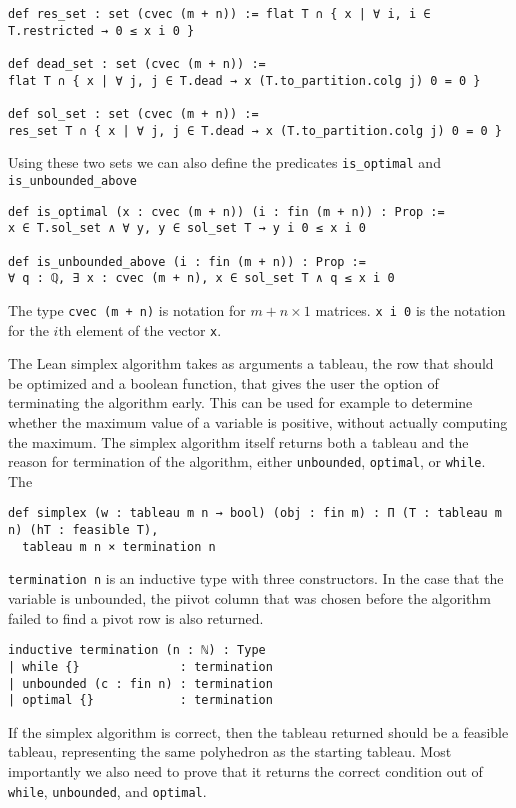 \documentclass[11pt]{article} %
\begin{document}
\begin{lstlisting}
def res_set : set (cvec (m + n)) := flat T ∩ { x | ∀ i, i ∈ T.restricted → 0 ≤ x i 0 }

def dead_set : set (cvec (m + n)) :=
flat T ∩ { x | ∀ j, j ∈ T.dead → x (T.to_partition.colg j) 0 = 0 }

def sol_set : set (cvec (m + n)) :=
res_set T ∩ { x | ∀ j, j ∈ T.dead → x (T.to_partition.colg j) 0 = 0 }
\end{lstlisting}

Using these two sets we can also define the predicates \lstinline|is_optimal| and \lstinline|is_unbounded_above|
\begin{lstlisting}
def is_optimal (x : cvec (m + n)) (i : fin (m + n)) : Prop :=
x ∈ T.sol_set ∧ ∀ y, y ∈ sol_set T → y i 0 ≤ x i 0

def is_unbounded_above (i : fin (m + n)) : Prop :=
∀ q : ℚ, ∃ x : cvec (m + n), x ∈ sol_set T ∧ q ≤ x i 0
\end{lstlisting}

The type \lstinline|cvec (m + n)| is notation for $m + n \times 1$ matrices. \lstinline|x i 0| is the notation for the $i$th element of the vector  \lstinline|x|.

The Lean simplex algorithm takes as arguments a tableau, the row that should be optimized and a boolean function, that gives the user the option of terminating the algorithm early. This can be used for example to determine whether the maximum value of a variable is positive, without actually computing the maximum. The simplex algorithm itself returns both a tableau and the reason for termination of the algorithm, either \lstinline|unbounded|, \lstinline|optimal|, or \lstinline|while|. The
\begin{lstlisting}
def simplex (w : tableau m n → bool) (obj : fin m) : Π (T : tableau m n) (hT : feasible T),
  tableau m n × termination n
\end{lstlisting}

\lstinline|termination n| is an inductive type with three constructors. In the case that the variable is unbounded, the piivot column that was chosen before the algorithm failed to find a pivot row is also returned.
\begin{lstlisting}
inductive termination (n : ℕ) : Type
| while {}              : termination
| unbounded (c : fin n) : termination
| optimal {}            : termination
\end{lstlisting}

If the simplex algorithm is correct, then the tableau returned should be a feasible tableau, representing the same polyhedron as the starting tableau. Most importantly we also need to prove that it returns the correct condition out of \lstinline|while|, \lstinline|unbounded|, and \lstinline|optimal|.
\end{document}
